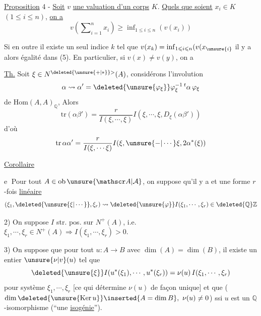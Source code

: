 \uline{Proposition} 4 - \uline{Soit} $v$ \uline{une valuation d'un corps} $K$. \uline{Quels que soient} $x_i\in K$ $(1\leqslant i\leqslant n)$, \uline{on a}
\[
v(\sum\nolimits_{i=1}^n x_i)\geqslant\inf\nolimits_{1\leqslant i\leqslant n}(v(x_i))\tag*{(5)}
\]

Si en outre il existe un seul indice $k$ tel que $v(x_k)=\inf_{1\leqslant i\leqslant n}(v(x_{\unsure{i}}$
il y a alors égalité dans (5). En particulier, si $v(x)\ne v(y)$, on a



\uline{Th.} Soit $\xi\in N^{\deleted{\unsure{+|*}}>}(A)$, considérons l'involution
\[
\alpha\leadsto\alpha'=\deleted{\unsure{\varphi_\xi}}\varphi_\xi^{-1}\,{}^{t}\alpha\,\varphi_\xi
\]
de $\mathrm{Hom}(A,A)_{\mathbb Q}$, Alors 
\[
\mathrm{tr}(\alpha\beta')=
\frac{r}{I(\xi,\cdots,\xi)}
I(\xi,\cdots,\xi,D_{\xi}(\alpha\beta'))
\]
d'où
\[
\mathrm{tr}\,\alpha\alpha'=
\frac{r}{I(\xi,\cdots\xi)}
I(\xi,\unsure{-|\cdots}\xi,2\alpha^*(\xi))
\]

\uline{Corollaire}



\textcircled{e} Pour tout $A\in\mathrm{ob}\,\unsure{\mathscr A|\mathcal A}$, on suppose qu'il y a  et une forme $r$-fois \uline{linéaire}
\[
(\xi_1,\deleted{\unsure{\xi|\cdots}},\xi_r)\leadsto
\deleted{\unsure{\varphi}}I(\xi_1,\cdots,\xi_r)\in\deleted{\mathbb Q}\mathbb Z
\]

2) On suppose $I$  str. pos. sur $N^+(A)$, i.e. $\xi_1,\cdots,\xi_r\in N^+(A)\Rightarrow I(\xi_1,\cdots,\xi_r)>0$.


3) On suppose que pour tout  $u:A\longrightarrow B$  avec $\dim(A)=\dim(B)$,  il existe un entier  $\unsure{\nu|v}(u)$ tel que
\[
\deleted{\unsure{\xi}} I(u^*(\xi_1),\cdots,u^*(\xi_r))=\nu(u)\,I(\xi_1,\cdots,\xi_r)
\]
pour  système $\xi_1,\cdots,\xi_r$ [ce qui détermine $\nu(u)$ de façon unique]\deleted{, \unsure{et} cf. plus \unsure{haut}]} et que ($\dim\deleted{\unsure{\mathrm{Ker}\,u}}\inserted{A=\dim B},\ \nu(u)\ne0$) ssi $u$ est un $\mathbb Q$-isomorphisme (``une \uline{isogénie}'').

